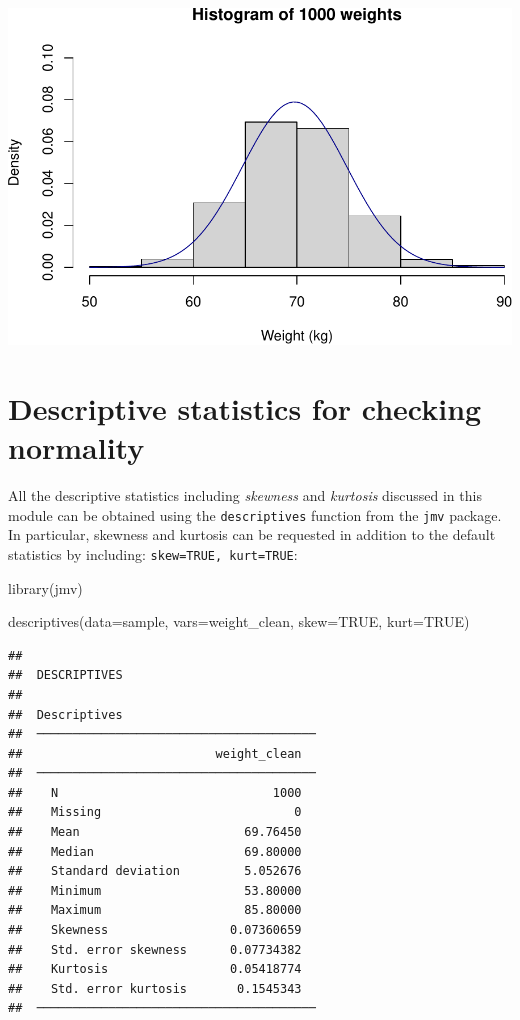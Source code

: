 \documentclass[
]{memoir}
\newenvironment{Shaded}{\begin{snugshade}}{\end{snugshade}}
\newcommand{\AttributeTok}[1]{\textcolor[rgb]{0.77,0.63,0.00}{#1}}
\newcommand{\ConstantTok}[1]{\textcolor[rgb]{0.00,0.00,0.00}{#1}}
\newcommand{\FunctionTok}[1]{\textcolor[rgb]{0.00,0.00,0.00}{#1}}
\newcommand{\NormalTok}[1]{#1}
\begin{document}
\includegraphics{phcm9795-R-notes_files/figure-latex/unnamed-chunk-59-1.pdf}

\hypertarget{descriptive-statistics-for-checking-normality}{%
\section{Descriptive statistics for checking normality}\label{descriptive-statistics-for-checking-normality}}

All the descriptive statistics including \emph{skewness} and \emph{kurtosis} discussed in this module can be obtained using the \texttt{descriptives} function from the \texttt{jmv} package. In particular, skewness and kurtosis can be requested in addition to the default statistics by including: \texttt{skew=TRUE,\ kurt=TRUE}:

\begin{Shaded}
\begin{Highlighting}[]
\FunctionTok{library}\NormalTok{(jmv)}

\FunctionTok{descriptives}\NormalTok{(}\AttributeTok{data=}\NormalTok{sample, }\AttributeTok{vars=}\NormalTok{weight\_clean, }\AttributeTok{skew=}\ConstantTok{TRUE}\NormalTok{, }\AttributeTok{kurt=}\ConstantTok{TRUE}\NormalTok{)}
\end{Highlighting}
\end{Shaded}

\begin{verbatim}
## 
##  DESCRIPTIVES
## 
##  Descriptives                            
##  ─────────────────────────────────────── 
##                           weight_clean   
##  ─────────────────────────────────────── 
##    N                              1000   
##    Missing                           0   
##    Mean                       69.76450   
##    Median                     69.80000   
##    Standard deviation         5.052676   
##    Minimum                    53.80000   
##    Maximum                    85.80000   
##    Skewness                 0.07360659   
##    Std. error skewness      0.07734382   
##    Kurtosis                 0.05418774   
##    Std. error kurtosis       0.1545343   
##  ───────────────────────────────────────
\end{verbatim}
\end{document}
